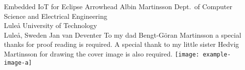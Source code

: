 \documentclass[12pt,a4paper,openright,final,twoside,ieeetran]{main}
\begin{document}
{\parskip=0pt
\def\thesistitle{Embedded IoT for Eclipse Arrowhead}
\def\theauthor{Albin Martinsson}
\def\theaddress{Dept.\ of Computer Science and Electrical Engineering\\
Lule{\aa} University of Technology\\ Lule{\aa}, Sweden}

\def\supervisors{Jan van Deventer}
\def\supervisorstring{Supervisor:} %
\def\dedication{To my dad Bengt-Göran Martinsson a special thanks for proof reading is required. A special thank to my little sister Hedvig Martinsson for drawing the cover image is also required.}

\def\theabstract{}
\def\thepreface{}



\def\thelogo{\texttt{[image: example-image-a]} \\ \vspace{1cm}} %


\startpreamble
  {\thesistitle}
  {\theauthor}
  {\theaddress}
  {\supervisors}
  {\dedication}
  {\theabstract}
  {\thepreface}
  {\thelogo}
}
\end{document}
